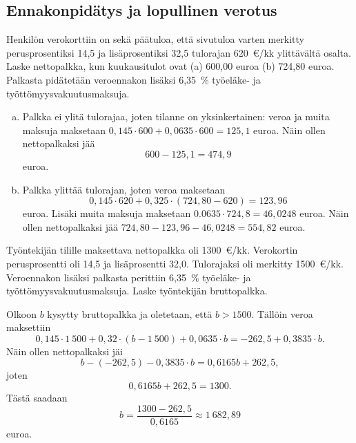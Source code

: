 \documentclass[a4paper,10pt]{article}\usepackage[]{graphicx}\usepackage[]{color}
\begin{document}
\subsection*{Ennakonpidätys ja lopullinen verotus}
\begin{question}
Henkilön verokorttiin on sekä päätuloa, että sivutuloa varten merkitty perusprosentiksi 14,5 ja lisäprosentiksi 32,5 tulorajan 620~\euro/kk ylittävältä osalta. Laske nettopalkka, kun kuukausitulot ovat (a) 600,00 euroa (b) 724,80 euroa. Palkasta pidätetään veroennakon lisäksi 6,35~\% työeläke- ja työttömyysvakuutusmaksuja.
\end{question}
\begin{solution}

\begin{enumerate}[(a)]
		\item Palkka ei ylitä tulorajaa, joten tilanne on yksinkertainen: veroa ja muita maksuja maksetaan \(0,145\cdot600 + 0,0635\cdot600 = 125{,}1\) euroa. Näin ollen nettopalkaksi jää 
\[
	600-125{,}1 = 474{,}9	
\]
euroa. 
		\item Palkka ylittää tulorajan, joten veroa maksetaan
		\[
			0{,}145\cdot620 + 0{,}325\cdot (724,80-620) = 123{,}96
		\] euroa. Lisäki muita maksuja maksetaan
 \(0.0635\cdot724{,}8 = 46{,}0248\) euroa. Näin ollen nettopalkaksi jää \(724,80 - 123{,}96-46{,}0248 = 554{,}82\) euroa.
	\end{enumerate}
\end{solution}


\begin{question}
Työntekijän tilille maksettava nettopalkka oli 1300~\euro/kk. Verokortin perusprosentti oli 14,5 ja lisäprosentti 32,0. Tulorajaksi oli merkitty 1500~\euro/kk. Veroennakon lisäksi palkasta perittiin 6,35~\% työeläke- ja työttömyysvakuutusmaksuja. Laske työntekijän bruttopalkka.
\end{question}
\begin{solution}

Olkoon \(b\) kysytty bruttopalkka ja oletetaan, että \(b > 1500\). Tällöin veroa maksettiin
\[
	0{,}145\cdot1~500 + 0{,}32\cdot(b - 1~500)  + 0{,}0635\cdot b = -262{,}5 + 0{,}3835\cdot b.
\]
Näin ollen nettopalkaksi jäi
\[
	b - (-262{,}5) - 0{,}3835\cdot b = 0{,}6165b+262{,}5,
\]
joten 
\[
	0{,}6165b + 262{,}5 = 1300.
\]
Tästä saadaan 
\[
	b = \frac{1300-262{,}5}{0{,}6165} \approx 1~682{,}89
\]
euroa. 
	
\end{solution}
\end{document}

